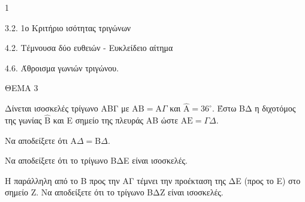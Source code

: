 \begin{ylh}{1}
    \item 3.2. 1ο Κριτήριο ισότητας τριγώνων
    \item 4.2. Τέμνουσα δύο ευθειών - Ευκλείδειο αίτημα
    \item 4.6. Άθροισμα γωνιών τριγώνου.
\end{ylh}

ΘΕΜΑ 3

Δίνεται ισοσκελές τρίγωνο ΑΒΓ με $\text{AB} = \text{A}\Gamma$ και $\widehat{\text{A}} = 36^\circ$. Έστω ΒΔ η διχοτόμος της γωνίας $\widehat{\text{B}}$ και Ε σημείο της πλευράς ΑΒ ώστε $\text{AE} = \Gamma\Delta$.

\begin{alist}
\item Να αποδείξετε ότι $\text{A}\Delta = \text{B}\Delta$. 

\item Να αποδείξετε ότι το τρίγωνο ΒΔΕ είναι ισοσκελές. 

\item Η παράλληλη από το Β προς την ΑΓ τέμνει την προέκταση της ΔΕ (προς το Ε) στο σημείο Ζ. Να αποδείξετε ότι το τρίγωνο ΒΔΖ είναι ισοσκελές. 


\begin{center}
\end{center}
\end{alist}
